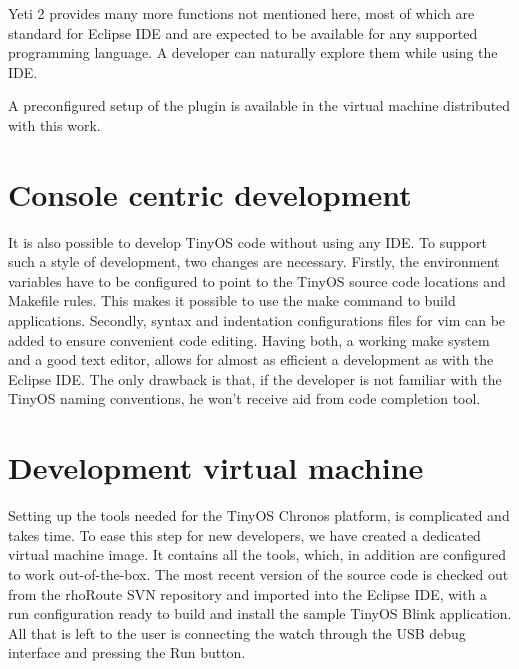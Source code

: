 Yeti 2 provides many more functions not mentioned here, most of which are standard for Eclipse IDE and are expected to be available for any supported programming language. A developer can naturally explore them while using the IDE.

A preconfigured setup of the plugin is available in the virtual machine distributed with this work.

\section{Console centric development}

It is also possible to develop TinyOS code without using any IDE.  To support such a style of development, two changes are necessary.  Firstly, the environment variables have to be configured to point to the TinyOS source code locations and Makefile rules. This makes it possible to use the make command to build applications. Secondly, syntax and indentation configurations files for vim can be added to ensure convenient code editing.  Having both, a working make system and a good text editor, allows for almost as efficient a development as with the Eclipse IDE. The only drawback is that, if the developer is not familiar with the TinyOS naming conventions, he won't receive aid from code completion tool.

\section{Development virtual machine}

Setting up the tools needed for the TinyOS Chronos platform, is complicated and takes time. To ease this step for new developers, we have created a dedicated virtual machine image. It contains all the tools, which, in addition are configured to work out-of-the-box. The most recent version of the source code is checked out from the rhoRoute SVN repository and imported into the Eclipse IDE, with a run configuration ready to build and install the sample TinyOS Blink application.  All that is left to the user is connecting the watch through the USB debug interface and pressing the Run button.



